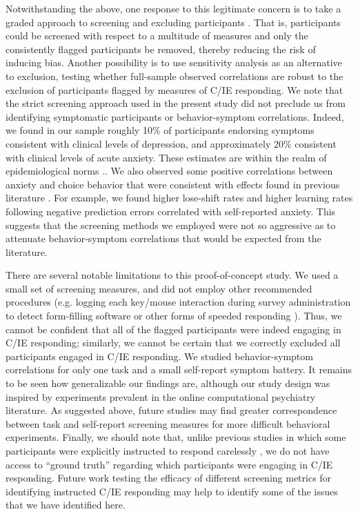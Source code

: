 \documentclass[a4paper,notitlepage,12pt]{article}
\begin{document}
Notwithstanding the above, one response to this legitimate concern is to take a graded approach to screening and excluding participants \cite{Kim2018-ev}. That is, participants could be screened with respect to a multitude of measures and only the consistently flagged participants be removed, thereby reducing the risk of inducing bias. Another possibility is to use sensitivity analysis as an alternative to exclusion, testing whether full-sample observed correlations are robust to the exclusion of participants flagged by measures of C/IE responding. We note that the strict screening approach used in the present study did not preclude us from identifying symptomatic participants or behavior-symptom correlations. Indeed, we found in our sample roughly 10\% of participants endorsing symptoms consistent with clinical levels of depression, and approximately 20\% consistent with clinical levels of acute anxiety. These estimates are within the realm of epidemiological norms \cite{kessler2012twelve, lowe2008validation, yarrington2021impact}.. We also observed some positive correlations between anxiety and choice behavior that were consistent with effects found in previous literature \cite{huang2017computational, harle2017anhedonia, garrett2018updating}. For example, we found higher lose-shift rates and higher learning rates following negative prediction errors correlated with self-reported anxiety. This suggests that the screening methods we employed were not so aggressive as to attenuate behavior-symptom correlations that would be expected from the literature. 

There are several notable limitations to this proof-of-concept study. We used a small set of screening measures, and did not employ other recommended procedures (e.g. logging each key/mouse interaction during survey administration to detect form-filling software or other forms of speeded responding \cite{buchanan2018methods}). Thus, we cannot be confident that all of the flagged participants were indeed engaging in C/IE responding; similarly, we cannot be certain that we correctly excluded all participants engaged in C/IE responding. We studied behavior-symptom correlations for only one task and a small self-report symptom battery. It remains to be seen how generalizable our findings are, although our study design was inspired by experiments prevalent in the online computational psychiatry literature. As suggested above, future studies may find greater correspondence between task and self-report screening measures for more difficult behavioral experiments. Finally, we should note that, unlike previous studies in which some participants were explicitly instructed to respond carelessly \cite{buchanan2018methods}, we do not have access to ``ground truth'' regarding which participants were engaging in C/IE responding. Future work testing the efficacy of different screening metrics for identifying instructed C/IE responding may help to identify some of the issues that we have identified here.
\end{document}
